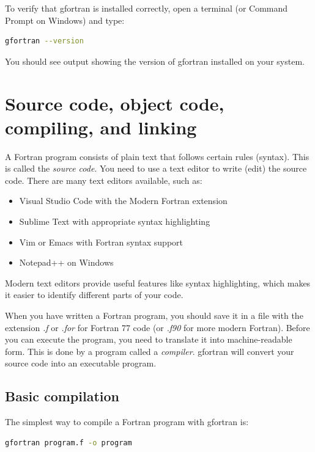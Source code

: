 To verify that gfortran is installed correctly, open a terminal (or Command Prompt on Windows) and type:

\begin{lstlisting}[language=bash]
gfortran --version
\end{lstlisting}

You should see output showing the version of gfortran installed on your system.

\section{Source code, object code, compiling, and linking}

A Fortran program consists of plain text that follows certain rules (syntax). This is called the \emph{source code}. You need to use a text editor to write (edit) the source code. There are many text editors available, such as:

\begin{itemize}
    \item Visual Studio Code with the Modern Fortran extension
    \item Sublime Text with appropriate syntax highlighting
    \item Vim or Emacs with Fortran syntax support
    \item Notepad++ on Windows
\end{itemize}

Modern text editors provide useful features like syntax highlighting, which makes it easier to identify different parts of your code.

When you have written a Fortran program, you should save it in a file with the extension \emph{.f} or \emph{.for} for Fortran 77 code (or \emph{.f90} for more modern Fortran). Before you can execute the program, you need to translate it into machine-readable form. This is done by a program called a \emph{compiler}. gfortran will convert your source code into an executable program.

\subsection{Basic compilation}

The simplest way to compile a Fortran program with gfortran is:

\begin{lstlisting}[language=bash]
gfortran program.f -o program
\end{lstlisting}

